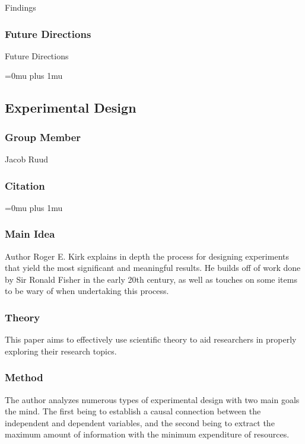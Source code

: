 \noindent
Findings

\subsubsection{Future Directions}

\noindent
Future Directions 

\Urlmuskip=0mu plus 1mu\relax

\noindent
\subsection{{Experimental} {Design}}

\subsubsection{Group Member}

\noindent
Jacob Ruud

\noindent
\subsubsection{Citation}

\Urlmuskip=0mu plus 1mu\relax

\subsubsection{Main Idea}

\noindent
Author Roger E. Kirk explains in depth the process for designing experiments that yield the most significant and meaningful results. He builds off of work done by Sir Ronald Fisher in the early 20th century, as well as touches on some items to be wary of when undertaking this process.

\subsubsection{Theory}

\noindent
This paper aims to effectively use scientific theory to aid researchers in properly exploring their research topics.

\subsubsection{Method}

\noindent
The author analyzes numerous types of experimental design with two main goals the mind. The first being to establish a causal connection between the independent and dependent variables, and the second being to extract the maximum amount of information with the minimum expenditure of resources.

